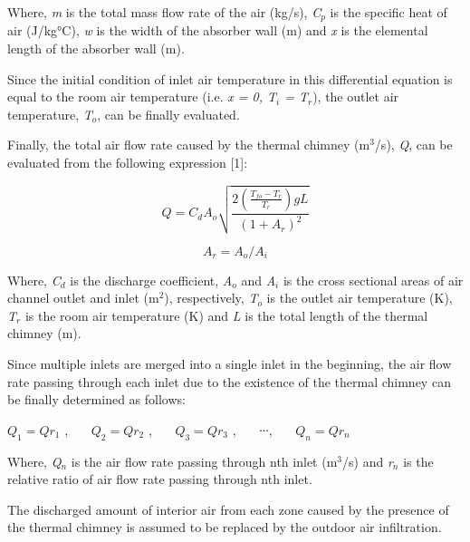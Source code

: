 Where, \emph{m} is the total mass flow rate of the air (kg/s), \emph{C\(_{p}\)} is the specific heat of air (J/kg°C), \emph{w} is the width of the absorber wall (m) and \emph{x} is the elemental length of the absorber wall (m).

Since the initial condition of inlet air temperature in this differential equation is equal to the room air temperature (i.e. \emph{x = 0, T\(_{i}\) = T\(_{r}\)}), the outlet air temperature, \emph{T\(_{o}\)}, can be finally evaluated.

Finally, the total air flow rate caused by the thermal chimney (m\(^{3}\)/s), \emph{Q}, can be evaluated from the following expression {[}1{]}:

\begin{equation}
Q = {C_d}{A_o}\sqrt {\frac{{2(\frac{{{T_{fo}} - {T_r}}}{{{T_r}}})gL}}{{{{(1 + {A_r})}^2}}}}
\end{equation}

\begin{equation}
{A_r} = {A_o}/{A_i}
\end{equation}

Where, \emph{C\(_{d}\)} is the discharge coefficient, \emph{A\(_{o}\)} and \emph{A\(_{i}\)} is the cross sectional areas of air channel outlet and inlet (m\(^{2}\)), respectively, \emph{T\(_{o}\)} is the outlet air temperature (K), \emph{T\(_{r}\)} is the room air temperature (K) and \emph{L} is the total length of the thermal chimney (m).

Since multiple inlets are merged into a single inlet in the beginning, the air flow rate passing through each inlet due to the existence of the thermal chimney can be finally determined as follows:

\({Q_1} = Q{r_1}\) ,~~~ \({Q_2} = Q{r_2}\) ,~~~ \({Q_3} = Q{r_3}\) ,~~~ ∙∙∙,~~~ \({Q_n} = Q{r_n}\)

Where, \emph{Q\(_{n}\)} is the air flow rate passing through nth inlet (m\(^{3}\)/s) and \emph{r\(_{n}\)} is the relative ratio of air flow rate passing through nth inlet.

The discharged amount of interior air from each zone caused by the presence of the thermal chimney is assumed to be replaced by the outdoor air infiltration.

